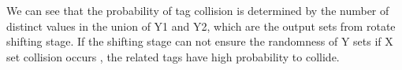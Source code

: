 \documentclass{article}
\begin{document}
We can see that the probability of tag collision is determined by the number of
distinct values in the union of Y1 and Y2, which are the output sets from rotate
shifting stage. If the shifting stage can not ensure the randomness of Y sets
if X set collision occurs , the related tags have high probability to collide.
\begin{figure}
\centering
{}
\end{figure}
\end{document}
